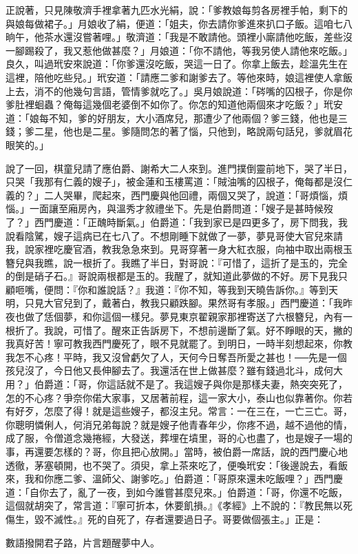 正說著，只見陳敬濟手裡拿著九匹水光絹，說：「爹教娘每剪各房裡手帕，剩下的與娘每做裙子。」月娘收了絹，便道：「姐夫，你去請你爹進來扒口子飯。這咱七八晌午，他茶水還沒嘗著哩。」敬濟道：「我是不敢請他。頭裡小廝請他吃飯，差些沒一腳踢殺了，我又惹他做甚麼？」月娘道：「你不請他，等我另使人請他來吃飯。」良久，叫過玳安來說道：「你爹還沒吃飯，哭這一日了。你拿上飯去，趁溫先生在這裡，陪他吃些兒。」玳安道：「請應二爹和謝爹去了。等他來時，娘這裡使人拿飯上去，消不的他幾句言語，管情爹就吃了。」吳月娘說道：「硶嘴的囚根子，你是你爹肚裡蛔蟲？俺每這幾個老婆倒不如你了。你怎的知道他兩個來才吃飯？」玳安道：「娘每不知，爹的好朋友，大小酒席兒，那遭少了他兩個？爹三錢，他也是三錢；爹二星，他也是二星。爹隨問怎的著了惱，只他到，略說兩句話兒，爹就眉花眼笑的。」

說了一回，棋童兒請了應伯爵、謝希大二人來到。進門撲倒靈前地下，哭了半日，只哭「我那有仁義的嫂子」，被金蓮和玉樓罵道：「賊油嘴的囚根子，俺每都是沒仁義的？」二人哭畢，爬起來，西門慶與他回禮，兩個又哭了，說道：「哥煩惱，煩惱。」一面讓至廂房內，與溫秀才敘禮坐下。先是伯爵問道：「嫂子是甚時候歿了？」西門慶道：「正醜時斷氣。」伯爵道：「我到家已是四更多了，房下問我，我說看陰騭，嫂子這病已在七八了。不想剛睡下就做了一夢，夢見哥使大官兒來請我，說家裡吃慶官酒，教我急急來到。見哥穿著一身大紅衣服，向袖中取出兩根玉簪兒與我瞧，說一根折了。我瞧了半日，對哥說：『可惜了，這折了是玉的，完全的倒是硝子石。』哥說兩根都是玉的。我醒了，就知道此夢做的不好。房下見我只顧咂嘴，便問：『你和誰說話？』我道：『你不知，等我到天曉告訴你。』等到天明，只見大官兒到了，戴著白，教我只顧跌腳。果然哥有孝服。」西門慶道：「我昨夜也做了恁個夢，和你這個一樣兒。夢見東京翟親家那裡寄送了六根簪兒，內有一根折了。我說，可惜了。醒來正告訴房下，不想前邊斷了氣。好不睜眼的天，撇的我真好苦！寧可教我西門慶死了，眼不見就罷了。到明日，一時半刻想起來，你教我怎不心疼！平時，我又沒曾虧欠了人，天何今日奪吾所愛之甚也！──先是一個孩兒沒了，今日他又長伸腳去了。我還活在世上做甚麼？雖有錢過北斗，成何大用？」伯爵道：「哥，你這話就不是了。我這嫂子與你是那樣夫妻，熱突突死了，怎的不心疼？爭奈你偌大家事，又居著前程，這一家大小，泰山也似靠著你。你若有好歹，怎麼了得！就是這些嫂子，都沒主兒。常言：一在三在，一亡三亡。哥，你聰明憐俐人，何消兄弟每說？就是嫂子他青春年少，你疼不過，越不過他的情，成了服，令僧道念幾捲經，大發送，葬埋在墳里，哥的心也盡了，也是嫂子一場的事，再還要怎樣的？哥，你且把心放開。」當時，被伯爵一席話，說的西門慶心地透徹，茅塞頓開，也不哭了。須臾，拿上茶來吃了，便喚玳安：「後邊說去，看飯來，我和你應二爹、溫師父、謝爹吃。」伯爵道：「哥原來還未吃飯哩？」西門慶道：「自你去了，亂了一夜，到如今誰嘗甚麼兒來。」伯爵道：「哥，你還不吃飯，這個就胡突了，常言道：『寧可折本，休要飢損。』《孝經》上不說的：『教民無以死傷生，毀不滅性。』死的自死了，存者還要過日子。哥要做個張主。」正是：

數語撥開君子路，片言題醒夢中人。

